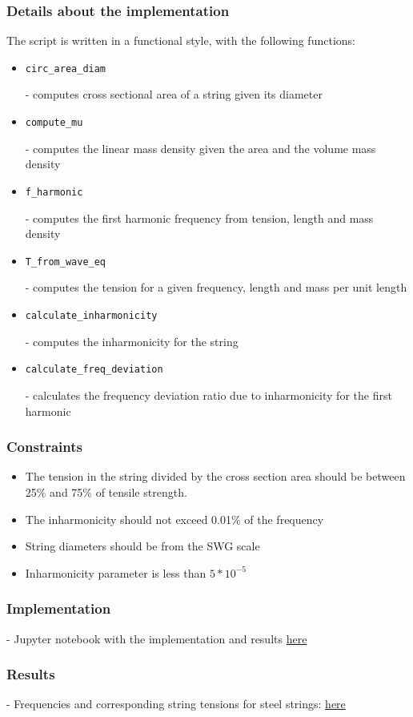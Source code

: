 \documentclass[a4paper,11pt]{article}
\begin{document}
\subsubsection*{Details about the implementation}
The script is written in a functional style, with the following functions:
\begin{itemize}
	\item \begin{verbatim}circ_area_diam\end{verbatim}- computes cross sectional area of a string given its diameter
	\item \begin{verbatim}compute_mu\end{verbatim}- computes the linear mass density given the area and the volume mass density
	\item \begin{verbatim}f_harmonic\end{verbatim}- computes the first harmonic frequency from tension, length and mass density
	\item \begin{verbatim}T_from_wave_eq\end{verbatim}- computes the tension for a given  frequency, length and mass per unit length
	\item \begin{verbatim}calculate_inharmonicity\end{verbatim}- computes the inharmonicity for the string
	\item \begin{verbatim}calculate_freq_deviation\end{verbatim}- calculates the frequency deviation ratio due to inharmonicity for the first harmonic
\end{itemize}
\subsubsection*{Constraints}
\begin{itemize}
	\item The tension in the string divided by the cross section area should be between 25\% and 75\% of tensile strength.
	\item The inharmonicity should not exceed 0.01\% of the frequency
	\item String diameters should be from the SWG scale
	\item Inharmonicity parameter is less than $5*10^{-5}$
\end{itemize}
\subsubsection*{Implementation}
- Jupyter notebook with the implementation and results \href{https://docs.google.com/spreadsheets/d/1Lzx0I2v2TZ8aA1razvSYvpoT3NF7jGif2orAO8jnT8Y/edit#gid=40375363}{here}
\subsubsection*{Results}
- Frequencies and corresponding string tensions for steel strings: \href{https://docs.google.com/spreadsheets/d/1JOnlDo6DXmJY8TRtKpOyS_VrxI3vw54WnmttQUaC2n4/edit#gid=0}{here}
\end{document}
